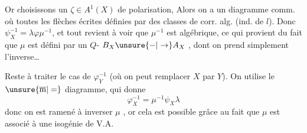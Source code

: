 Or choisissons un $\zeta\in A^1(X)$ de polarisation, Alors on a un diagramme comm.
où toutes les flèches écrites   définies par des classes de corr. alg. (ind. de $l$).  Donc $\psi_X^{-1}=\lambda\varphi\mu^{-1}$, et tout revient à voir que $\mu^{-1}$ est algébrique, ce qui provient du fait que $\mu$ est défini par un $Q$- $B_X\unsure{\mathbin{-}|\to}A_X$ , dont on prend simplement l'inverse\ldots{}

Reste à traiter le cas de $\varphi_Y^{-1}$ (où on peut remplacer $X$ par $Y$). On utilise le $\unsure{\overline{\mathrm m}|=}$ diagramme, qui donne
\[
\varphi_X^{-1}=\mu^{-1}\psi_X\lambda
\]
donc on est ramené à inverser $\mu$ , or cela est possible grâce au fait que $\mu$ est associé à une isogénie de V.A.

